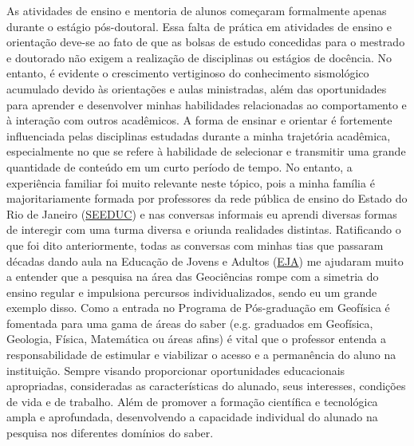 \documentclass[10pt,a4paper,oneside]{book}
\begin{document}
As atividades de ensino e mentoria de alunos começaram formalmente apenas durante o estágio pós-doutoral. Essa falta de prática em atividades de ensino e orientação deve-se ao fato de que as bolsas de estudo concedidas para o mestrado e doutorado não exigem a realização de disciplinas ou estágios de docência. No entanto, é evidente o crescimento vertiginoso do conhecimento sismológico acumulado devido às orientações e aulas ministradas, além das oportunidades para aprender e desenvolver minhas habilidades relacionadas ao comportamento e à interação com outros acadêmicos. A forma de ensinar e orientar é fortemente influenciada pelas disciplinas estudadas durante a minha trajetória acadêmica, especialmente no que se refere à habilidade de selecionar e transmitir uma grande quantidade de conteúdo em um curto período de tempo. No entanto, a experiência familiar foi muito relevante neste tópico, pois a minha família é majoritariamente formada por professores da rede pública de ensino do Estado do Rio de Janeiro (\href{https://www.seeduc.rj.gov.br/}{SEEDUC}) e nas conversas informais eu aprendi diversas formas de interegir com uma turma diversa e oriunda realidades distintas. Ratificando o que foi dito anteriormente, todas as conversas com minhas tias que passaram décadas dando aula na Educação de Jovens e Adultos (\href{http://portal.mec.gov.br/index.php?option=com_docman&view=download&alias=13448-diretrizes-curiculares-nacionais-2013-pdf&Itemid=30192}{EJA}) me ajudaram muito a entender que a pesquisa na área das Geociências rompe com a simetria do ensino regular e impulsiona percursos individualizados, sendo eu um grande exemplo disso. Como a entrada no Programa de Pós-graduação em Geofísica é fomentada para uma gama de áreas do saber (e.g. graduados em Geofísica, Geologia, Física, Matemática ou áreas afins) é vital que o professor entenda a responsabilidade de estimular e viabilizar o acesso e a permanência do aluno na instituição. Sempre visando proporcionar oportunidades educacionais apropriadas, consideradas as características do alunado, seus interesses, condições de vida e de trabalho. Além de promover a formação científica e tecnológica ampla e aprofundada, desenvolvendo a capacidade individual do alunado na pesquisa nos diferentes domínios do saber.
\end{document}
